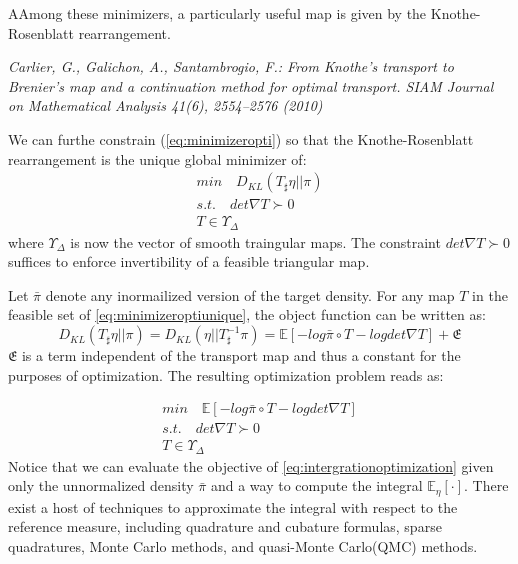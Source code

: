 \documentclass[a4paper, 11pt]{article}
\begin{document}
\begin{CJK}{UTF8}{gbsn}
AAmong these minimizers, a particularly useful map is given by the Knothe-Rosenblatt rearrangement.

\emph{Carlier, G., Galichon, A., Santambrogio, F.: From Knothe’s transport to Brenier’s map and a continuation
method for optimal transport. SIAM Journal on Mathematical Analysis 41(6), 2554–2576 (2010)
}

We can furthe constrain (\ref{eq:minimizeropti}) so that the Knothe-Rosenblatt rearrangement is the unique global minimizer of:
\begin{equation}\label{eq:minimizeroptiunique}
\begin{aligned}
min \quad D_{KL}(T_{\sharp}\eta || \pi)\\
s.t. \quad det \nabla T \succ 0 \\
T \in \Upsilon_{\Delta}
\end{aligned}
\end{equation}
where $\Upsilon_{\Delta}$ is now the vector of smooth traingular maps. The constraint $det \nabla T \succ 0$ suffices to enforce invertibility of a feasible triangular map.

Let $\bar{\pi}$ denote any inormailized version of the target density. For any map $T$ in the feasible set of \eqref{eq:minimizeroptiunique}, the object function can be written as:
\begin{equation}
D_{KL}(T_{\sharp}\eta || \pi) = D_{KL}(\eta || T_{\sharp}^{-1}\pi ) = \mathbb{E}[-log \bar{\pi} \circ T - log det \nabla T] + \mathfrak{E}
\end{equation}
$\mathfrak{E}$ is a term independent of the transport map and thus a constant for the purposes of optimization. The resulting optimization problem reads as:

\begin{equation}\label{eq:intergrationoptimization}
\begin{aligned}
min \quad \mathbb{E}[-log \bar{\pi} \circ T - log det \nabla T]\\
s.t. \quad det \nabla T \succ 0 \\
T \in \Upsilon_{\Delta}
\end{aligned}
\end{equation}
Notice that we can evaluate the objective of \eqref{eq:intergrationoptimization} given only the unnormalized density $\bar{\pi}$ and a way to compute the integral $\mathbb{E}_{\eta}[\cdot]$. There exist a host of techniques to approximate the integral with respect to the reference measure, including quadrature and cubature formulas, sparse quadratures, Monte Carlo methods, and quasi-Monte Carlo(QMC) methods.


\end{CJK}
\end{document}
